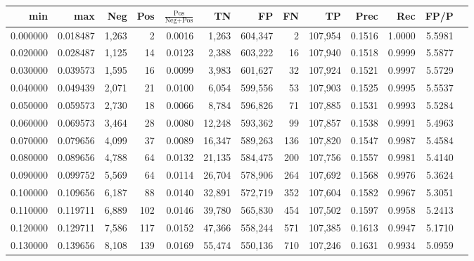 \begin{tabular}{rrrrrrrrrrrrr}
\toprule
     min &      max &    Neg &   Pos & $\frac{\text{Pos}}{\text{Neg}+\text{Pos}}$ &      TN &      FP &      FN &      TP &   Prec &    Rec &   FP/P \\
\midrule
0.000000 & 0.018487 &  1,263 &     2 &                                     0.0016 &   1,263 & 604,347 &       2 & 107,954 & 0.1516 & 1.0000 & 5.5981 \\
0.020000 & 0.028487 &  1,125 &    14 &                                     0.0123 &   2,388 & 603,222 &      16 & 107,940 & 0.1518 & 0.9999 & 5.5877 \\
0.030000 & 0.039573 &  1,595 &    16 &                                     0.0099 &   3,983 & 601,627 &      32 & 107,924 & 0.1521 & 0.9997 & 5.5729 \\
0.040000 & 0.049439 &  2,071 &    21 &                                     0.0100 &   6,054 & 599,556 &      53 & 107,903 & 0.1525 & 0.9995 & 5.5537 \\
0.050000 & 0.059573 &  2,730 &    18 &                                     0.0066 &   8,784 & 596,826 &      71 & 107,885 & 0.1531 & 0.9993 & 5.5284 \\
0.060000 & 0.069573 &  3,464 &    28 &                                     0.0080 &  12,248 & 593,362 &      99 & 107,857 & 0.1538 & 0.9991 & 5.4963 \\
0.070000 & 0.079656 &  4,099 &    37 &                                     0.0089 &  16,347 & 589,263 &     136 & 107,820 & 0.1547 & 0.9987 & 5.4584 \\
0.080000 & 0.089656 &  4,788 &    64 &                                     0.0132 &  21,135 & 584,475 &     200 & 107,756 & 0.1557 & 0.9981 & 5.4140 \\
0.090000 & 0.099752 &  5,569 &    64 &                                     0.0114 &  26,704 & 578,906 &     264 & 107,692 & 0.1568 & 0.9976 & 5.3624 \\
0.100000 & 0.109656 &  6,187 &    88 &                                     0.0140 &  32,891 & 572,719 &     352 & 107,604 & 0.1582 & 0.9967 & 5.3051 \\
0.110000 & 0.119711 &  6,889 &   102 &                                     0.0146 &  39,780 & 565,830 &     454 & 107,502 & 0.1597 & 0.9958 & 5.2413 \\
0.120000 & 0.129711 &  7,586 &   117 &                                     0.0152 &  47,366 & 558,244 &     571 & 107,385 & 0.1613 & 0.9947 & 5.1710 \\
0.130000 & 0.139656 &  8,108 &   139 &                                     0.0169 &  55,474 & 550,136 &     710 & 107,246 & 0.1631 & 0.9934 & 5.0959 \\

\end{tabular}
